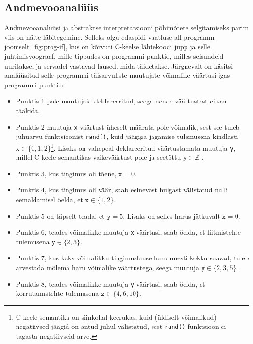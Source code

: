 \documentclass[../thesis.tex]{subfiles}
\begin{document}
\subsection{Andmevooanalüüs}
Andmevooanalüüsi ja abstraktse interpretatsiooni põhimõtete selgitamiseks parim viis on näite läbitegemine. Selleks olgu edaspidi vaatluse all programm jooniselt~\ref{fig:prog-if}, kus on kõrvuti C-keelse lähtekoodi jupp ja selle juhtimisvoograaf, mille tippudes on programmi punktid, milles seisundeid uuritakse, ja servadel vastavad laused, mida täidetakse.
Järgnevalt on käsitsi analüüsitud selle programmi täisarvuliste muutujate võimalike väärtusi igas programmi punktis:
\begin{itemize}
	\item Punktis 1 pole muutujaid deklareeritud, seega nende väärtustest ei saa rääkida.
	\item Punktis 2 muutuja \texttt{x} väärtust üheselt määrata pole võimalik, sest see tuleb juhuarvu funktsioonist \texttt{rand()}, kuid jäägiga jagamise tulemusena kindlasti $\texttt{x} \in \{0, 1, 2\}$\footnote{C keele semantika on siinkohal keerukas, kuid (üldiselt võimalikud) negatiivsed jäägid on antud juhul välistatud, sest \texttt{rand()} funktsioon ei tagasta negatiivseid arve.}.
	Lisaks on vahepeal deklareeritud väärtustamata muutuja \texttt{y}, millel C keele semantikas vaikeväärtust pole ja seetõttu $\texttt{y} \in \mathbb{Z}$ \cite{C11_draft}.
	\item Punktis 3, kus tingimus oli tõene, $\texttt{x} = 0$.
	\item Punktis 4, kus tingimus oli väär, saab eelnevast hulgast välistatud nulli eemaldamisel öelda, et $\texttt{x} \in \{1, 2\}$.
	\item Punktis 5 on täpselt teada, et $\texttt{y} = 5$. Lisaks on selles harus jätkuvalt $\texttt{x} = 0$.
	\item Punktis 6, teades võimalikke muutuja \texttt{x} väärtusi, saab öelda, et liitmistehte tulemusena $\texttt{y} \in \{2, 3\}$.
	\item Punktis 7, kus kaks võimalikku tingimuslause haru uuesti kokku saavad, tuleb arvestada mõlema haru võimalike väärtustega, seega muutuja $\texttt{y} \in \{2, 3, 5\}$.
	\item Punktis 8, teades võimalikke muutuja \texttt{y} väärtusi, saab öelda, et korrutamistehte tulemusena $\texttt{z} \in \{4, 6, 10\}$.
\begin{comment}
	\item Punktides 1, 2 ja 3 on muutuja veel väärtustamata. Kuna C keele semantika sellisel juhul mingit vaikeväärtust ei anna, siis võimalikke väärtusi kirjeldab kõige ebatäpsem domeeni element $\top = \mathbb{Z}$.
	\item Punktis 4 on muutujale just antud konstantne väärtus, mistõttu seda kirjeldab kõige paremini element $\{5\}$.


\end{comment}
\end{itemize}
\end{document}
